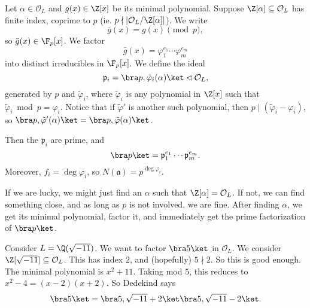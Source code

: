 \documentclass[a4paper]{article}
\begin{document}
\begin{thm}
  Let $\alpha \in \mathcal{O}_L$ and $g(x) \in \Z[x]$ be its minimal polynomial. Suppose $\Z[\alpha] \subseteq \mathcal{O}_L$ has finite index, coprime to $p$ (ie. $p \nmid |\mathcal{O}_L/\Z[\alpha]|$). We write
  \[
    \bar{g}(x) = g(x) \pmod p,
  \]
  so $\bar{g}(x) \in \F_p[x]$. We factor
  \[
    \bar{g}(x) = \varphi_1^{e_1} \cdots \varphi_m^{e_m}
  \]
  into distinct irreducibles in $\F_p[x]$. We define the ideal
  \[
    \mathfrak{p}_i = \bra p, \tilde{\varphi}_i(\alpha)\ket \lhd \mathcal{O}_L,
  \]
  generated by $p$ and $\tilde{\varphi}_i$, where $\tilde{\varphi}_i$ is any polynomial in $\Z[x]$ such that $\tilde{\varphi}_i \bmod p = \varphi_i$. Notice that if $\tilde{\varphi}'$ is another such polynomial, then $p \mid (\tilde{\varphi}_i - \varphi_i)$, so $\bra p, \tilde{\varphi}'(\alpha)\ket = \bra p, \tilde{\varphi}(\alpha)\ket$.

  Then the $\mathfrak{p}_i$ are prime, and
  \[
    \bra p\ket = \mathfrak{p}_1^{e_1} \cdots \mathfrak{p}_m^{e_m}.
  \]
  Moreover, $f_i = \deg \varphi_i$, so $N(\mathfrak{a}) = p^{\deg \varphi_i}$.
\end{thm}
If we are lucky, we might just find an $\alpha$ such that $\Z[\alpha] = \mathcal{O}_L$. If not, we can find something close, and as long as $p$ is not involved, we are fine. After finding $\alpha$, we get its minimal polynomial, factor it, and immediately get the prime factorization of $\bra p\ket$.

\begin{eg}
  Consider $L = \Q(\sqrt{-11})$. We want to factor $\bra 5\ket$ in $\mathcal{O}_L$. We consider $\Z[\sqrt{-11}] \subseteq \mathcal{O}_L$. This has index $2$, and (hopefully) $5\nmid 2$. So this is good enough. The minimal polynomial is $x^2 + 11$. Taking mod $5$, this reduces to $x^2 - 4 = (x - 2)(x + 2)$. So Dedekind says
  \[
    \bra 5\ket = \bra 5, \sqrt{-11} + 2\ket\bra 5, \sqrt{-11} - 2\ket.
  \]
\end{eg}
\end{document}

